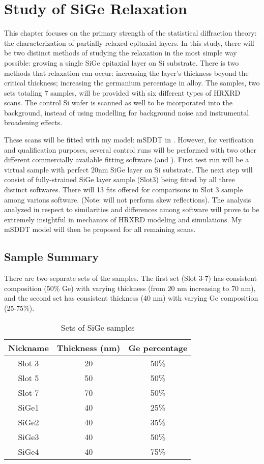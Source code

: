\chapter{Study of SiGe Relaxation}

This chapter focuses on the primary strength of the statistical diffraction theory:  the characterization of partially relaxed epitaxial layers.  In this study, there will be two distinct methods of studying the relaxation in the most simple way possible: growing a single SiGe epitaxial layer on Si substrate.  There is two methods that relaxation can occur:   increasing the layer's thickness beyond the critical thickness;  increasing the germanium percentage in alloy.  The samples, two sets totaling 7 samples, will be provided with six different types of HRXRD scans.   The control Si wafer is scanned as well to be incorporated into the background, instead of using modelling for background noise and instrumental broadening effects.

These scans will be fitted with my model:  mSDDT in \MathLogo.  However, for verification and qualification purposes, several control runs will be performed with two other different commercially available fitting software (\LEPTOS and \RADS).  First test run will be a virtual sample with perfect 20nm SiGe layer on Si substrate.  The next step will consist of  fully-strained SiGe layer sample (Slot3)  being fitted by all three distinct softwares.  There will 13 fits offered for comparisons in Slot 3 sample among various software. (Note:  \RADS will not perform skew reflections).  The analysis analyzed in respect to similarities and differences among software will prove to be extremely insightful in mechanics of HRXRD modeling and simulations.  My mSDDT model will then be proposed for all remaining scans.  


\section{Sample Summary}

There are two separate sets of the samples.  The first set (Slot 3-7) has consistent composition (50\% Ge) with varying thickness (from 20 nm increasing to 70 nm), and the second set has consistent thickness (40 nm) with varying Ge composition (25-75\%).

\begin{table}[h]
\caption{Sets of SiGe samples}
\label{TableSiGe-set}
\centering
\begin{tabular}{c|cc}
Nickname & Thickness (nm)  & Ge percentage\\
\hline
Slot 3 	& 20	& 50\% \\
Slot 5 	& 50	&50\%\\
Slot 7	& 70	&50\%\\
\hline
SiGe1	& 40	&  25\% \\
SiGe2	& 40 	& 35\%\\
SiGe3	& 40	& 50\%\\
SiGe4	& 40 	& 75\%\\
\end{tabular}
\end{table}


